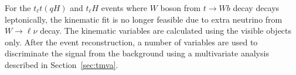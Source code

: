 For the  $t_{\ell}t(qH)$ and $t_{\ell}H$ events where $W$ boson from $t\to W b$ decay decays leptonically,
the kinematic fit is no longer feasible due to extra neutrino from $W\rightarrow \ell\nu$ decay. The kinematic variables are calculated using the visible
objects only. After the event reconstruction, a number of variables are used to discriminate the signal from the background using a multivariate analysis described
in Section~\ref{sec:tmva}.


